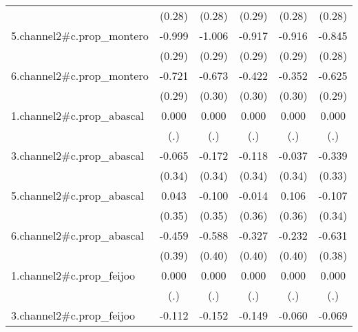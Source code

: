 \begin{table}[htbp]
\begin{tabular}{l*{5}{c}}
            &      (0.28)         &      (0.28)         &      (0.29)         &      (0.28)         &      (0.28)         \\
5.channel2#c.prop\_montero&      -0.999\sym{***}&      -1.006\sym{***}&      -0.917\sym{**} &      -0.916\sym{**} &      -0.845\sym{**} \\
            &      (0.29)         &      (0.29)         &      (0.29)         &      (0.29)         &      (0.28)         \\
6.channel2#c.prop\_montero&      -0.721\sym{*}  &      -0.673\sym{*}  &      -0.422         &      -0.352         &      -0.625\sym{*}  \\
            &      (0.29)         &      (0.30)         &      (0.30)         &      (0.30)         &      (0.29)         \\
1.channel2#c.prop\_abascal&       0.000         &       0.000         &       0.000         &       0.000         &       0.000         \\
            &         (.)         &         (.)         &         (.)         &         (.)         &         (.)         \\
3.channel2#c.prop\_abascal&      -0.065         &      -0.172         &      -0.118         &      -0.037         &      -0.339         \\
            &      (0.34)         &      (0.34)         &      (0.34)         &      (0.34)         &      (0.33)         \\
5.channel2#c.prop\_abascal&       0.043         &      -0.100         &      -0.014         &       0.106         &      -0.107         \\
            &      (0.35)         &      (0.35)         &      (0.36)         &      (0.36)         &      (0.34)         \\
6.channel2#c.prop\_abascal&      -0.459         &      -0.588         &      -0.327         &      -0.232         &      -0.631         \\
            &      (0.39)         &      (0.40)         &      (0.40)         &      (0.40)         &      (0.38)         \\
1.channel2#c.prop\_feijoo&       0.000         &       0.000         &       0.000         &       0.000         &       0.000         \\
            &         (.)         &         (.)         &         (.)         &         (.)         &         (.)         \\
3.channel2#c.prop\_feijoo&      -0.112         &      -0.152         &      -0.149         &      -0.060         &      -0.069         \\

\end{tabular}
\end{table}

